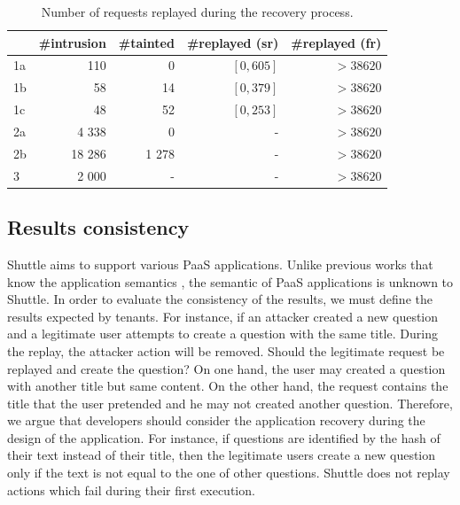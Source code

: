 \begin{table}
\footnotesize
\begin{tabular}{l|rrrr}
    & \#intrusion & \#tainted & \#replayed (sr)     & \#replayed (fr) \\ \hline
1a       & 110          & 0          & $[0, 605]$   & $> 38 620$  \\
1b       & 58           & 14         & $[0, 379]$   & $> 38 620$  \\
1c       & 48           & 52         & $[0, 253]$   & $> 38 620$  \\
2a       & 4 338        & 0          &  -           & $> 38 620$  \\
2b       & 18 286       & 1 278      &  -           & $> 38 620$  \\
3        & 2 000        & -          &  -           & $> 38 620$  \\
\end{tabular}
  \caption{Number of requests replayed during the recovery process.}
  \label{tab:accuracy}
  \vspace{-5mm}
\end{table}





\subsection{Results consistency}\label{sec:eval:accuracy:consistency}
Shuttle aims to support various \ac{PaaS} applications. Unlike previous works that know the application semantics \cite{undoForOperators}, the semantic of \ac{PaaS} applications is unknown to Shuttle. In order to evaluate the consistency of the results, we must define the results expected by tenants. For instance, if an attacker created a new question and a legitimate user attempts to create a question with the same title. During the replay, the attacker action will be removed. Should the legitimate request be replayed and create the question? On one hand, the user may created a question with another title but same content. On the other hand, the request contains the title that the user pretended and he may not created another question. Therefore, we argue that developers should consider the application recovery during the design of the application. For instance, if questions are identified by the hash of their text instead of their title, then the legitimate users create a new question only if the text is not equal to the one of other questions. Shuttle does not replay actions which fail during their first execution.\\


